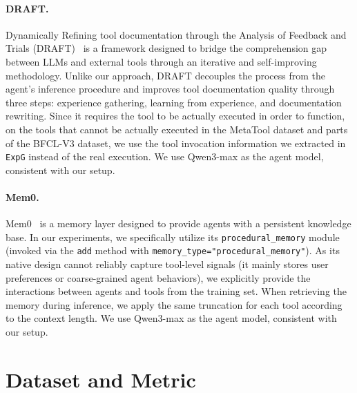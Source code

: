 \documentclass[11pt]{article}
\newcommand{\ours}{\texttt{ExpG}}
\begin{document}
\paragraph{DRAFT.} Dynamically Refining
tool documentation through the Analysis of Feedback and Trials (DRAFT)~\cite{Draft} is a framework designed to bridge the comprehension gap between LLMs and external tools through an iterative and self-improving methodology. Unlike our approach, DRAFT decouples the process from the agent's inference procedure and improves tool documentation quality through three steps: experience gathering, learning from experience, and documentation rewriting. Since it requires the tool to be actually executed in order to function, on the tools that cannot be actually executed in the MetaTool dataset and parts of the BFCL-V3 dataset, we use the tool invocation information we extracted in {\ours} instead of the real execution. We use Qwen3-max as the agent model, consistent with our setup.
\paragraph{Mem0.} Mem0~\cite{chhikara2025mem0} is a memory layer designed to provide agents with a persistent knowledge base. In our experiments, we specifically utilize its \texttt{procedural\_memory} module (invoked via the \texttt{add} method with \texttt{memory\_type="procedural\_memory"}). As its native design cannot reliably capture tool-level signals (it mainly stores user preferences or coarse-grained agent behaviors), we explicitly provide the interactions between agents and tools from the training set. When retrieving the memory during inference, we apply the same truncation for each tool according to the context length. We use Qwen3-max as the agent model, consistent with our setup.
\label{tried}


\section{Dataset and Metric}\label{app:dataset}
\end{document}
